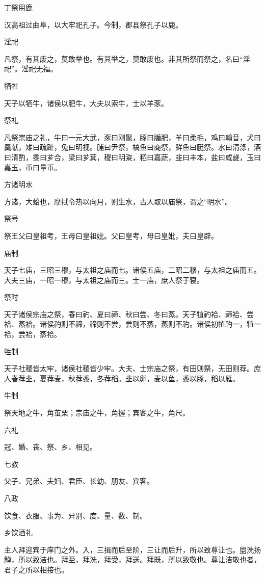 \documentclass[a4paper,12pt,UTF8,twoside]{ctexbook}
\begin{document}
    丁祭用鹿
    
    汉高祖过曲阜，以大牢祀孔子。今制，郡县祭孔子以鹿。
    
    淫祀
    
    凡祭，有其废之，莫敢举也。有其举之，莫敢废也。非其所祭而祭之，名曰“淫祀”。淫祀无福。
    
    牺牲
    
    天子以牺牛，诸侯以肥牛，大夫以索牛，士以羊豕。
    
    祭礼
    
    凡祭宗庙之礼，牛曰一元大武，豕曰刚鬣，豚曰腯肥，羊曰柔毛，鸡曰翰音，犬曰羹献，雉曰疏趾，兔曰明视。脯曰尹祭，槁鱼曰商祭，鲜鱼曰脡祭。水曰清涤，酒曰清酌，黍曰芗合，梁曰芗萁，稷曰明粢，稻曰嘉蔬，韭曰丰本，盐曰咸鹾，玉曰嘉玉，币曰量币。
    
    方诸明水
    
    方诸，大蛤也，摩拭令热以向月，则生水，古人取以庙祭，谓之“明水”。
    
    祭号
    
    祭王父曰皇祖考，王母曰皇祖妣。父曰皇考，母曰皇妣，夫曰皇辟。
    
    庙制
    
    天子七庙，三昭三穆，与太祖之庙而七。诸侯五庙，二昭二穆，与太祖之庙而五。大夫三庙，一昭一穆，与太祖之庙而三。士一庙，庶人祭于寝。
    
    祭时
    
    天子诸侯宗庙之祭，春曰礿、夏曰禘、秋曰尝、冬曰蒸。天子犆礿袷、禘袷、尝袷、蒸袷。诸侯礿则不禘，禘则不尝，尝则不蒸，蒸则不礿。诸侯初犆礿一，犆一袷，尝袷，蒸袷。
    
    牲制
    
    天子社稷皆太牢，诸侯社稷皆少牢。大夫、士宗庙之祭，有田则祭，无田则荐。庶人春荐韭，夏荐麦，秋荐黍，冬荐稻。韭以卵，麦以鱼，黍以豚，稻以雁。
    
    牛制
    
    祭天地之牛，角茧栗；宗庙之牛，角握；宾客之牛，角尺。
    
    六礼
    
    冠、婚、丧、祭、乡、相见。
    
    七教
    
    父子、兄弟、夫妇、君臣、长幼、朋友、宾客。
    
    八政
    
    饮食、衣服、事为、异别、度、量、数、制。
    
    乡饮酒礼
    
    主人拜迎宾于庠门之外。入，三揖而后至阶，三让而后升，所以致尊让也。盥洗扬觯，所以致洁也。拜至，拜洗，拜受，拜送。拜既，所以致敬也。尊让洁敬也者，君子之所以相接也。
    
\end{document}

